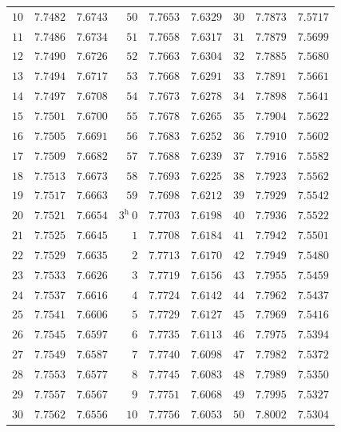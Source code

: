 \begin{center}
\begin{tabular}{r|r|r||r|r|r||r|r|r}
$10$ & $7.7482$ & $7.6743$ & $50$ & $7.7653$ & $7.6329$ & $30$ & $7.7873$ & $7.5717$\\
$11$ & $7.7486$ & $7.6734$ & $51$ & $7.7658$ & $7.6317$ & $31$ & $7.7879$ & $7.5699$\\
$12$ & $7.7490$ & $7.6726$ & $52$ & $7.7663$ & $7.6304$ & $32$ & $7.7885$ & $7.5680$\\
$13$ & $7.7494$ & $7.6717$ & $53$ & $7.7668$ & $7.6291$ & $33$ & $7.7891$ & $7.5661$\\
$14$ & $7.7497$ & $7.6708$ & $54$ & $7.7673$ & $7.6278$ & $34$ & $7.7898$ & $7.5641$\\
$15$ & $7.7501$ & $7.6700$ & $55$ & $7.7678$ & $7.6265$ & $35$ & $7.7904$ & $7.5622$\\
$16$ & $7.7505$ & $7.6691$ & $56$ & $7.7683$ & $7.6252$ & $36$ & $7.7910$ & $7.5602$\\
$17$ & $7.7509$ & $7.6682$ & $57$ & $7.7688$ & $7.6239$ & $37$ & $7.7916$ & $7.5582$\\
$18$ & $7.7513$ & $7.6673$ & $58$ & $7.7693$ & $7.6225$ & $38$ & $7.7923$ & $7.5562$\\
$19$ & $7.7517$ & $7.6663$ & $59$ & $7.7698$ & $7.6212$ & $39$ & $7.7929$ & $7.5542$\\
$20$ & $7.7521$ & $7.6654$ & $3^{\mathrm h}\ 0$ & $7.7703$ & $7.6198$ & $40$ & $7.7936$ & $7.5522$\\
$21$ & $7.7525$ & $7.6645$ & $1$ & $7.7708$ & $7.6184$ & $41$ & $7.7942$ & $7.5501$\\
$22$ & $7.7529$ & $7.6635$ & $2$ & $7.7713$ & $7.6170$ & $42$ & $7.7949$ & $7.5480$\\
$23$ & $7.7533$ & $7.6626$ & $3$ & $7.7719$ & $7.6156$ & $43$ & $7.7955$ & $7.5459$\\
$24$ & $7.7537$ & $7.6616$ & $4$ & $7.7724$ & $7.6142$ & $44$ & $7.7962$ & $7.5437$\\
$25$ & $7.7541$ & $7.6606$ & $5$ & $7.7729$ & $7.6127$ & $45$ & $7.7969$ & $7.5416$\\
$26$ & $7.7545$ & $7.6597$ & $6$ & $7.7735$ & $7.6113$ & $46$ & $7.7975$ & $7.5394$\\
$27$ & $7.7549$ & $7.6587$ & $7$ & $7.7740$ & $7.6098$ & $47$ & $7.7982$ & $7.5372$\\
$28$ & $7.7553$ & $7.6577$ & $8$ & $7.7745$ & $7.6083$ & $48$ & $7.7989$ & $7.5350$\\
$29$ & $7.7557$ & $7.6567$ & $9$ & $7.7751$ & $7.6068$ & $49$ & $7.7995$ & $7.5327$\\
$30$ & $7.7562$ & $7.6556$ & $10$ & $7.7756$ & $7.6053$ & $50$ & $7.8002$ & $7.5304$\\

\end{tabular}
\end{center}
